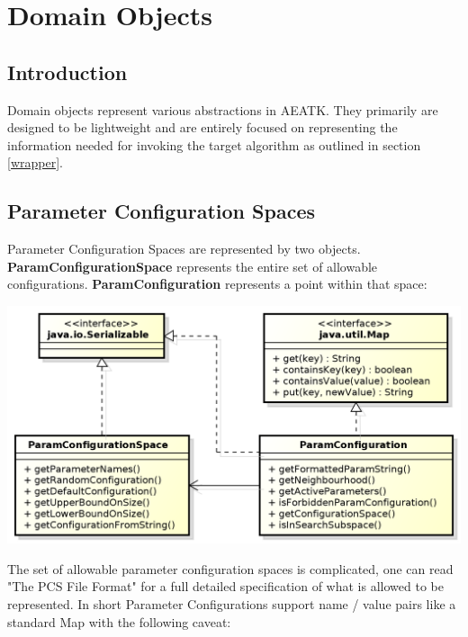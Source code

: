 \documentclass[11pt,letterpaper,oneside]{article}
\begin{document}
\section{Domain Objects}
\label{sec:domain}
\subsection{Introduction}

Domain objects represent various abstractions in AEATK. They primarily are designed to be lightweight and are entirely focused on representing the information needed for invoking the target algorithm as outlined in section \ref{wrapper}.

\subsection{Parameter Configuration Spaces}

Parameter Configuration Spaces are represented by two objects. \textbf{ParamConfigurationSpace} represents the entire set of allowable configurations. \textbf{ParamConfiguration} represents a point within that space:

\begin{center}
\includegraphics[scale=0.75]{img/UML/ConfigurationSpace.png}
\end{center}


The set of allowable parameter configuration spaces is complicated, one can read "The PCS File Format" for a full detailed specification of what is allowed to be represented. In short Parameter Configurations support name / value pairs like a standard Map with the following caveat:
\end{document}
